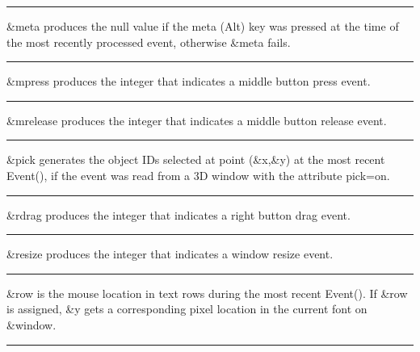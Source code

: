 \bigskip\hrule\vspace{0.1cm}

\noindent
\textsf{\&meta} produces the null value if the meta (Alt) key was
pressed at the time of the most recently processed event, otherwise
\textsf{\&meta} fails.

\bigskip\hrule\vspace{0.1cm}

\noindent
\textsf{\&mpress} produces the integer that indicates a middle button
press event.

\bigskip\hrule\vspace{0.1cm}

\noindent
\textsf{\&mrelease} produces the integer that indicates a middle button
release event.

\bigskip\hrule\vspace{0.1cm}

\noindent
\textsf{\&pick} generates the object IDs selected at point
(\textsf{\&x},\textsf{\&y}) at the most recent \textsf{Event()}, if the
event was read from a 3D window with the attribute \textsf{pick=on}.

\bigskip\hrule\vspace{0.1cm}

\noindent
\textsf{\&rdrag} produces the integer that indicates a right button drag
event.

\bigskip\hrule\vspace{0.1cm}

\noindent
\textsf{\&resize} produces the integer that indicates a window resize
event.

\bigskip\hrule\vspace{0.1cm}

\noindent
\textsf{\&row} is the mouse location in text rows during the most recent
\textsf{Event()}. If \textsf{\&row} is assigned, \textsf{\&y} gets a
corresponding pixel location in the current font on \textsf{\&window}.

\bigskip\hrule\vspace{0.1cm}

